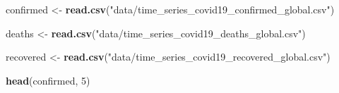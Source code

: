 \documentclass[]{article}
\newenvironment{Shaded}{\begin{snugshade}}{\end{snugshade}}
\newcommand{\DecValTok}[1]{\textcolor[rgb]{0.00,0.00,0.81}{#1}}
\newcommand{\KeywordTok}[1]{\textcolor[rgb]{0.13,0.29,0.53}{\textbf{#1}}}
\newcommand{\NormalTok}[1]{#1}
\newcommand{\StringTok}[1]{\textcolor[rgb]{0.31,0.60,0.02}{#1}}
\begin{document}
\begin{Shaded}
\begin{Highlighting}[]
\NormalTok{confirmed <-}\StringTok{ }\KeywordTok{read.csv}\NormalTok{(}\StringTok{"data/time_series_covid19_confirmed_global.csv"}\NormalTok{)}

\NormalTok{deaths <-}\StringTok{ }\KeywordTok{read.csv}\NormalTok{(}\StringTok{"data/time_series_covid19_deaths_global.csv"}\NormalTok{)}

\NormalTok{recovered <-}\StringTok{ }\KeywordTok{read.csv}\NormalTok{(}\StringTok{"data/time_series_covid19_recovered_global.csv"}\NormalTok{)}

\KeywordTok{head}\NormalTok{(confirmed, }\DecValTok{5}\NormalTok{)}
\end{Highlighting}
\end{Shaded}
\end{document}
